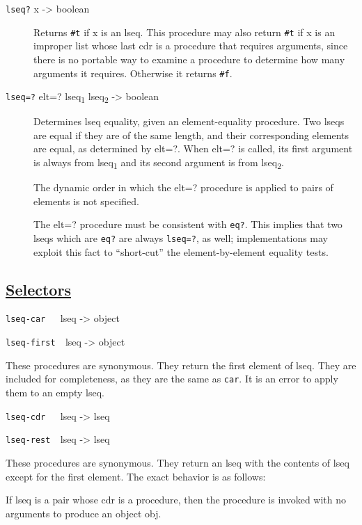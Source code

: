 \begin{description}
\item[ \texttt{lseq?} x -\textgreater{} boolean \href{}{} ]
Returns \texttt{\#t} if x is an lseq. This procedure may also return
\texttt{\#t} if x is an improper list whose last cdr is a procedure that
requires arguments, since there is no portable way to examine a
procedure to determine how many arguments it requires. Otherwise it
returns \texttt{\#f}.
\item[ \href{}{} \texttt{lseq=?} elt=? lseq\textsubscript{1}
lseq\textsubscript{2} -\textgreater{} boolean ]
Determines lseq equality, given an element-equality procedure. Two lseqs
are equal if they are of the same length, and their corresponding
elements are equal, as determined by elt=?. When elt=? is called, its
first argument is always from lseq\textsubscript{1} and its second
argument is from lseq\textsubscript{2}.

The dynamic order in which the elt=? procedure is applied to pairs of
elements is not specified.

The elt=? procedure must be consistent with \texttt{eq?}. This implies
that two lseqs which are \texttt{eq?} are always \texttt{lseq=?}, as
well; implementations may exploit this fact to ``short-cut'' the
element-by-element equality tests.
\end{description}

\subsection{\texorpdfstring{\href{}{Selectors}}{Selectors}}\label{selectors}

\href{}{} \texttt{lseq-car\ \ \ }lseq -\textgreater{} object

\href{}{} \texttt{lseq-first\ \ }lseq -\textgreater{} object

These procedures are synonymous. They return the first element of lseq.
They are included for completeness, as they are the same as
\texttt{car}. It is an error to apply them to an empty lseq.

\href{}{} \texttt{lseq-cdr\ \ \ }lseq -\textgreater{} lseq

\href{}{} \texttt{lseq-rest\ \ }lseq -\textgreater{} lseq

These procedures are synonymous. They return an lseq with the contents
of lseq except for the first element. The exact behavior is as follows:

If lseq is a pair whose cdr is a procedure, then the procedure is
invoked with no arguments to produce an object obj.

